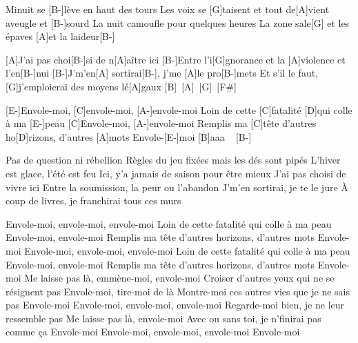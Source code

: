 
\begin{guitar}
Minuit se [B-]lève en haut des tours
Les voix se [G]taisent et tout de[A]vient aveugle et [B-]sourd
La nuit camoufle pour quelques heures
La zone sale[G] et les épaves [A]et la laideur[B-]

[A]J'ai pas choi[B-]si de n[A]aître ici
[B-]Entre l'i[G]gnorance et la [A]violence et l'en[B-]nui
[B-]J'm'en[A] sortirai[B-], j'me [A]le pro[B-]mets
Et s'il le faut, [G]j'emploierai des moyens lé[A]gaux [B]~[A]~[G]~[F#]

[E-]Envole-moi, [C]envole-moi, [A-]envole-moi
Loin de cette [C]fatalité [D]qui colle à ma [E-]peau
[C]Envole-moi, [A-]envole-moi
Remplis ma [C]tête d'autres ho[D]rizons, d'autres [A]mots
Envole-[E-]moi  [B]aaa ~ [B-]

Pas de question ni rébellion
Règles du jeu fixées mais les dés sont pipés
L'hiver est glace, l'été est feu
Ici, y'a jamais de saison pour être mieux
J'ai pas choisi de vivre ici
Entre la soumission, la peur ou l'abandon
J'm'en sortirai, je te le jure
À coup de livres, je franchirai tous ces murs

Envole-moi, envole-moi, envole-moi
Loin de cette fatalité qui colle à ma peau
Envole-moi, envole-moi
Remplis ma tête d'autres horizons, d'autres mots
Envole-moi
Envole-moi, envole-moi, envole-moi
Loin de cette fatalité qui colle à ma peau
Envole-moi, envole-moi
Remplis ma tête d'autres horizons, d'autres mots
Envole-moi
Me laisse pas là, emmène-moi, envole-moi
Croiser d'autres yeux qui ne se résignent pas
Envole-moi, tire-moi de là
Montre-moi ces autres vies que je ne sais pas
Envole-moi
Envole-moi, envole-moi, envole-moi
Regarde-moi bien, je ne leur ressemble pas
Me laisse pas là, envole-moi
Avec ou sans toi, je n'finirai pas comme ça
Envole-moi
Envole-moi, envole-moi, envole-moi
Envole-moi
\end{guitar}